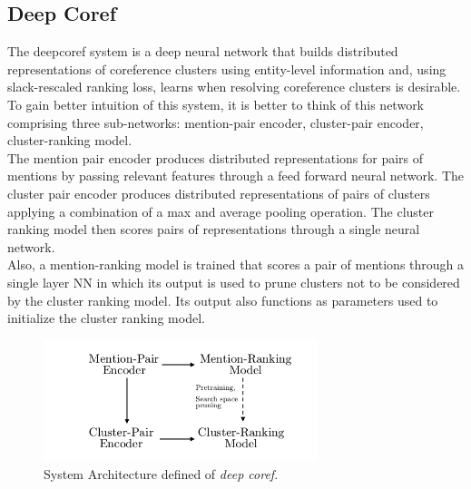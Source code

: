 \documentclass[11pt]{article}
\begin{document}
\subsection{Deep Coref}
The deepcoref system is a deep neural network that builds distributed representations of coreference clusters using entity-level information and, using slack-rescaled ranking loss, learns when resolving coreference clusters is desirable. To gain better intuition of this system, it is better to think of this network comprising three sub-networks: mention-pair encoder, cluster-pair encoder, cluster-ranking model. \\
The mention pair encoder produces distributed representations for pairs of mentions by passing relevant features through a feed forward neural network. The cluster pair encoder produces distributed representations of pairs of clusters applying a combination of a max and average pooling operation. The cluster ranking model then scores pairs of representations through a single neural network. \\
Also, a mention-ranking model is trained that scores a pair of mentions through a single layer NN in which its output is used to prune clusters not to be considered by the cluster ranking model. Its output also functions as parameters used to initialize the cluster ranking model. \\

\begin{figure}[h]
\includegraphics[width=8cm]{deepneural}
\centering
\caption{System Architecture defined of \textit{deep coref}.}
\end{figure}
\end{document}
